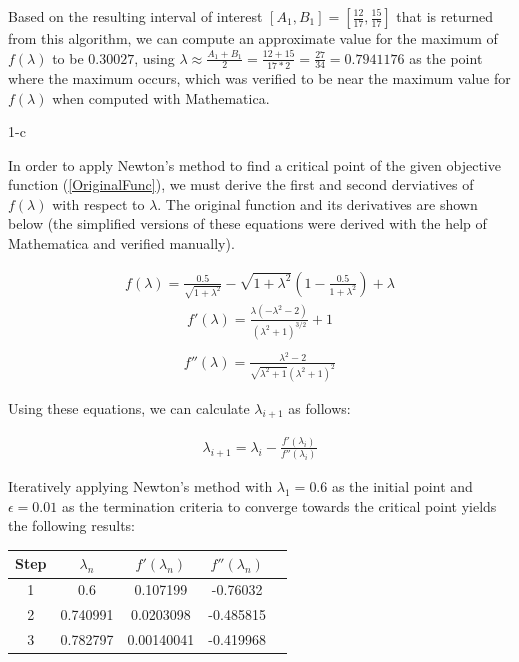 \documentclass[11pt]{article}
\begin{document}
\begin{sol}
Based on the resulting interval of interest $[A_1,B_1] = [\frac{12}{17},\frac{15}{17}]$ that is returned from this algorithm, we can compute an approximate value for the maximum of $f(\lambda)$ to be $0.30027$, using $\lambda \approx \frac{A_1+B_1}{2} = \frac{12+15}{17*2} = \frac{27}{34} = 0.7941176$ as the point where the maximum occurs, which was verified to be near the maximum value for $f(\lambda)$ when computed with Mathematica.

\end{sol}

\begin{prob}{1-c}
\end{prob}
\begin{sol} 

In order to apply Newton's method to find a critical point of the given objective function (\ref{OriginalFunc}), we must derive the first and second derviatives of $f(\lambda)$ with respect to $\lambda$. The original function and its derivatives are shown below (the simplified versions of these equations were derived with the help of Mathematica and verified manually).

\begin{eqnarray*}
f(\lambda)=\frac{0.5}{\sqrt{1+\lambda^2}}-\sqrt{1+\lambda^2} \left(1-\frac{0.5}{1+\lambda^2}\right)+\lambda
\end{eqnarray*}
\begin{eqnarray*}
f'(\lambda)=\frac{\lambda \left(-\lambda^2-2\right)}{\left(\lambda^2+1\right)^{3/2}}+1 \\
\end{eqnarray*}
\begin{eqnarray*}
f''(\lambda)=\frac{\lambda^2-2}{\sqrt{\lambda^2+1} \left(\lambda^2+1\right)^2}
\end{eqnarray*}

Using these equations, we can calculate $\lambda_{i+1}$ as follows:

\begin{eqnarray*}
\lambda_{i+1} = \lambda_i - \frac{f'(\lambda_i)}{f''(\lambda_i)}
\end{eqnarray*}

Iteratively applying Newton's method with $\lambda_1 = 0.6$ as the initial point and $\epsilon=0.01$ as the termination criteria to converge towards the critical point yields the following results:

\begin{center}
  \begin{tabular}{| c | c | c | c | c |}
    \hline
	Step & $\lambda_{n}$ & $f'(\lambda_n)$ & $f''(\lambda_n)$ \\ \hline
	1 & 0.6 & 0.107199 & -0.76032 \\ \hline
	2 & 0.740991 & 0.0203098 & -0.485815 \\ \hline
	3 & 0.782797 & 0.00140041 & -0.419968 \\ \hline	
  \end{tabular}
\end{center}


\end{sol}
\end{document}
